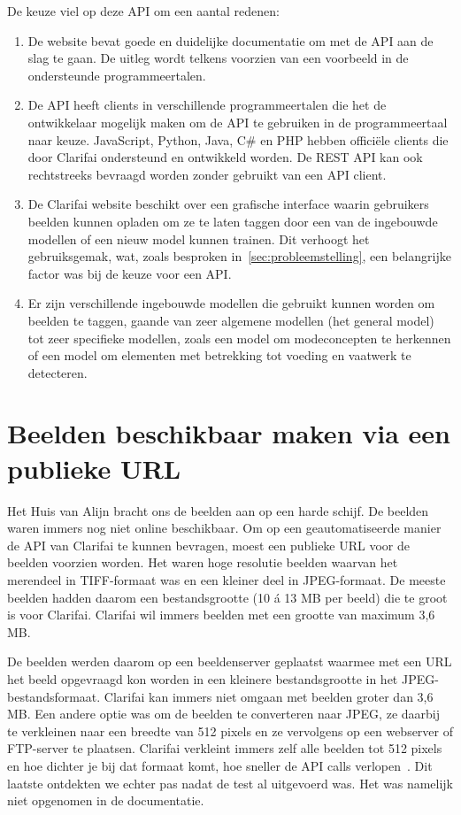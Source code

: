 De keuze viel op deze API om een aantal redenen:
\begin{enumerate}
	\item De website bevat goede en duidelijke documentatie om met de API aan de slag te gaan. De uitleg wordt telkens voorzien van een voorbeeld in de ondersteunde programmeertalen. %
	\item De API heeft clients in verschillende programmeertalen die het de ontwikkelaar mogelijk maken om de API te gebruiken in de programmeertaal naar keuze. JavaScript, Python, Java, C\# en PHP hebben officiële clients die door Clarifai ondersteund en ontwikkeld worden. De REST API kan ook rechtstreeks bevraagd worden zonder gebruikt van een API client.
	\item De Clarifai website beschikt over een grafische interface waarin gebruikers beelden kunnen opladen om ze te laten taggen door een van de ingebouwde modellen of een nieuw model kunnen trainen. Dit verhoogt het gebruiksgemak, wat, zoals besproken in~\ref{sec:probleemstelling}, een belangrijke factor was bij de keuze voor een API.
	\item Er zijn verschillende ingebouwde modellen die gebruikt kunnen worden om beelden te taggen, gaande van zeer algemene modellen (het general model) tot zeer specifieke modellen, zoals een model om modeconcepten te herkennen of een model om elementen met betrekking tot voeding en vaatwerk te detecteren.
\end{enumerate}

\section{Beelden beschikbaar maken via een publieke URL}

Het Huis van Alijn bracht ons de beelden aan op een harde schijf. De beelden waren immers nog niet online beschikbaar. Om op een geautomatiseerde manier de API van Clarifai te kunnen bevragen, moest een publieke URL voor de beelden voorzien worden. Het waren hoge resolutie beelden waarvan het merendeel in TIFF-formaat was en een kleiner deel in JPEG-formaat. De meeste beelden hadden daarom een bestandsgrootte (10 \'{a} 13 MB per beeld) die te groot is voor Clarifai. Clarifai wil immers beelden met een grootte van maximum 3,6 MB. 

De beelden werden daarom op een beeldenserver geplaatst waarmee met een URL het beeld opgevraagd kon worden in een kleinere bestandsgrootte in het JPEG-bestandsformaat. Clarifai kan immers niet omgaan met beelden groter dan 3,6 MB. Een andere optie was om de beelden te converteren naar JPEG, ze daarbij te verkleinen naar een breedte van 512 pixels en ze vervolgens op een webserver of FTP-server te plaatsen. Clarifai verkleint immers zelf alle beelden tot 512 pixels en hoe dichter je bij dat formaat komt, hoe sneller de API calls verlopen~\autocite{Clairbot2019}. Dit laatste ontdekten we echter pas nadat de test al uitgevoerd was. Het was namelijk niet opgenomen in de documentatie.

